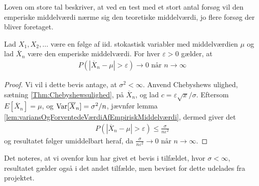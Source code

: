 Loven om store tal beskriver, at ved en test med et stort antal forsøg vil den emperiske middelværdi nærme sig den teoretiske middelværdi, jo flere forsøg der bliver foretaget.
\begin{thm} \label{thm:law_of_large_numbers}%
    Lad $X_1, X_2, \dots$ være en følge af iid. stokastisk variabler med middelværdien $\mu$ og lad $\overline{X}_{n}$ være den emperiske middelværdi. For hver $\varepsilon>0$ gælder, at
    \begin{align*}
        P(|\overline{X}_{n}-\mu|>\varepsilon) \rightarrow 0 \text{ når } n \rightarrow \infty
    \end{align*}
\end{thm}
\begin{proof}
  Vi vil i dette bevis antage, at $\sigma^{2} < \infty$. Anvend Chebyshews ulighed, sætning \ref{Thm:Chebyshewsulighed}, på $\overline{X}_{n}$, og lad $c=\varepsilon \sqrt{x}/\sigma$. Eftersom $E[\overline{X}_{n}]=\mu$, og $\textnormal{Var}[\overline{X}_{n}]=\sigma^2/n$, jævnfør lemma \ref{lem:variansOgForventedeVærdiAfEmpiriskMiddelværdi}, dermed giver det
    \begin{align*}
        P(|\overline{X}_{n}-\mu| > \varepsilon) \leq \frac{\sigma}{n\varepsilon^2}
    \end{align*}
  og resultatet følger umiddelbart heraf, da $\frac{\sigma}{n\varepsilon^2} \rightarrow 0 \text{ når } n \rightarrow \infty.$
\end{proof}
\begin{rem}
  Det noteres, at vi ovenfor kun har givet et bevis i tilfældet, hvor $\sigma < \infty$, resultatet gælder også i det andet tilfælde, men beviset for dette udelades fra projektet.
\end{rem}
